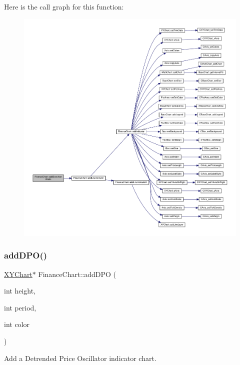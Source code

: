 Here is the call graph for this function\+:
\nopagebreak
\begin{figure}[H]
\begin{center}
\leavevmode
\includegraphics[width=350pt]{class_finance_chart_a0cb226ad13bc836d8b5731d280e2201c_cgraph}
\end{center}
\end{figure}
\mbox{\label{class_finance_chart_ad1f0a674349a991edc1cfe4197b75860}} 
\subsubsection{\texorpdfstring{add\+D\+P\+O()}{addDPO()}}
{\footnotesize\ttfamily \hyperlink{class_x_y_chart}{X\+Y\+Chart}$\ast$ Finance\+Chart\+::add\+D\+PO (\begin{DoxyParamCaption}\item[{int}]{height,  }\item[{int}]{period,  }\item[{int}]{color }\end{DoxyParamCaption})\hspace{0.3cm}{\ttfamily [inline]}}



Add a Detrended Price Oscillator indicator chart. 


